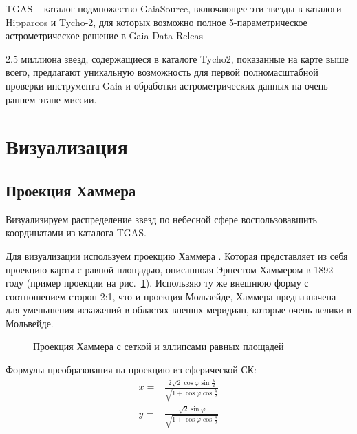 \documentclass[14pt]{article} %
\begin{document}
TGAS -- каталог подмножество GaiaSource, включающее эти звезды в каталоги Hipparcos и Tycho-2, для которых возможно полное 5-параметрическое астрометрическое решение в Gaia Data Releas

2.5 миллиона звезд, содержащиеся в каталоге Tycho2, показанные на карте выше всего, предлагают уникальную возможность для первой полномасштабной проверки инструмента Gaia и обработки астрометрических данных на очень раннем этапе миссии.

\section{Визуализация}\label{errvid}

\subsection{Проекция Хаммера}\label{sub:smthrs}

Визуализируем распределение звезд по небесной сфере воспользовавшить координатами из каталога TGAS. 

Для визуализации используем проекцию Хаммера . Которая представляет из себя проекцию карты с равной площадью, описанноая Эрнестом Хаммером в 1892 году (пример проекции на рис.~\ref{img:hammtiss}). Использяю ту же внешнюю форму с соотношением сторон 2:1, что и проекция Мользейде, Хаммера предназначена для уменьшения искажений в областях внешнх меридиан, которые очень велики в Мольвейде. 

\begin{figure}[h!]
\caption{Проекция Хаммера с сеткой и эллипсами равных площадей}
\label{img:hammtiss}
\end{figure}

Формулы преобразования на проекцию из сферической СК:
\begin{equation*}
\begin{array}{cl}
x = &\frac{2 \sqrt 2 \cos \varphi \sin \frac{\lambda}{2}}{\sqrt{1 + \cos \varphi \cos \frac{\lambda}{2}}}\\
y = &\frac{\sqrt 2\sin \varphi}{\sqrt{1 + \cos \varphi \cos \frac{\lambda}{2}}}\\
\end{array}
\end{equation*}
\end{document}
